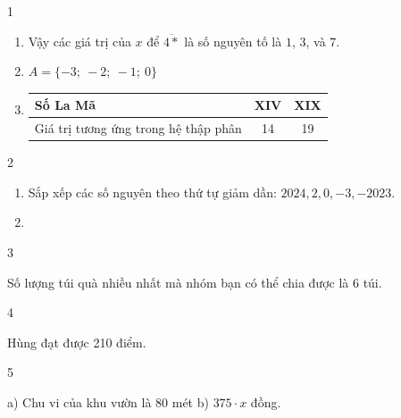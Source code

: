 \begin{Solbook}{1}
 \par \noindent  \begin {enumerate} \item Vậy các giá trị của $x$ để $\overline {4*}$ là số nguyên tố là $1$, $3$, và $7$. \par \item $A=\{-3;\ -2;\ -1;\ 0\}$ \par \item \begin {tabular}{|l|c|c|} \hline Số La Mã & XIV & XIX \\ \hline Giá trị tương ứng trong hệ thập phân & 14 & 19 \\ \hline \end {tabular} \par \end {enumerate}  \hfill \qedEX 
\end{Solbook}
\begin{Solbook}{2}
 \par \noindent  \begin {enumerate} \item Sắp xếp các số nguyên theo thứ tự giảm dần: $2024, 2, 0, -3, -2023$. \par \item \par {} \par \end {enumerate}  \hfill \qedEX 
\end{Solbook}
\begin{Solbook}{3}
 \par \noindent Số lượng túi quà nhiều nhất mà nhóm bạn có thể chia được là 6 túi. \hfill \qedEX 
\end{Solbook}
\begin{Solbook}{4}
 \par \noindent Hùng đạt được 210 điểm. \hfill \qedEX 
\end{Solbook}
\begin{Solbook}{5}
 \par \noindent a) Chu vi của khu vườn là $80$ mét \hfill b) $375\cdot x$ đồng.  \hfill \qedEX 
\end{Solbook}
